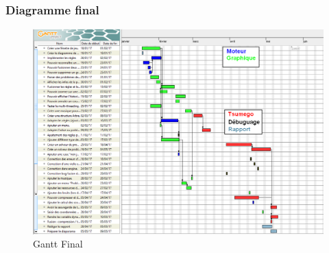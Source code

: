         \subsubsection{Diagramme final}
            \begin{figure}[h!]
            \centering
            \includegraphics[scale=0.30]{figures/experiments/gantt-final.png}
            \caption{Gantt Final}
            \label{fig:gantt2}
            \end{figure}    
